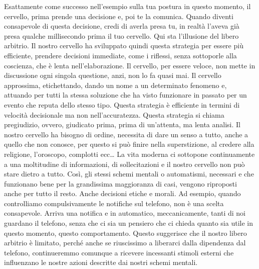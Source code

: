\documentclass[12pt]{book} %
\begin{document}
Esattamente come successo nell'esempio sulla tua postura in questo momento, il cervello, prima
prende una decisione e, poi te la comunica. Quando diventi consapevole di questa decisione, credi di averla presa tu,
in realtà l'aveva già presa qualche millisecondo prima il tuo cervello. Qui sta
l'illusione del libero arbitrio. Il nostro cervello ha sviluppato quindi questa strategia per
essere più efficiente, prendere decisioni immediate, come i riflessi, senza sottoporle alla coscienza, che è lenta
nell'elaborazione. Il cervello, per essere veloce, non mette in discussione ogni singola
questione, anzi, non lo fa quasi mai. Il cervello approssima, etichettando, dando un nome a un determinato fenomeno e,
attuando per tutti la stessa soluzione che ha visto funzionare in passato per un evento che reputa dello stesso tipo.
Questa strategia è efficiente in termini di velocità decisionale ma non nell'accuratezza. Questa
strategia si chiama pregiudizio, ovvero, giudicato prima, prima di un'attenta, ma lenta analisi.
Il nostro cervello ha bisogno di ordine, necessita di dare un senso a tutto, anche a quello che non conosce, per questo
si può finire nella superstizione, al credere alla religione, l'oroscopo, complotti ecc… La vita
moderna ci sottopone continuamente a una moltitudine di informazioni, di sollecitazioni e il nostro cervello non può
stare dietro a tutto. Così, gli stessi schemi mentali o automatismi, necessari e che funzionano bene per la grandissima
maggioranza di casi, vengono riproposti anche per tutto il resto. Anche decisioni etiche e morali. 
Ad esempio, quando controlliamo compulsivamente le notifiche sul telefono, non è una scelta consapevole. Arriva una notifica e in automatico, meccanicamente, tanti di noi guardano il telefono, senza che ci sia un pensiero che ci chieda quanto sia utile in questo momento, questo comportamento. Questo suggerisce che il nostro libero arbitrio è limitato, perché anche se riuscissimo a liberarci dalla dipendenza dal telefono, continueremmo comunque a ricevere incessanti stimoli esterni che influenzano le nostre azioni descritte dai nostri schemi mentali.
\end{document}
